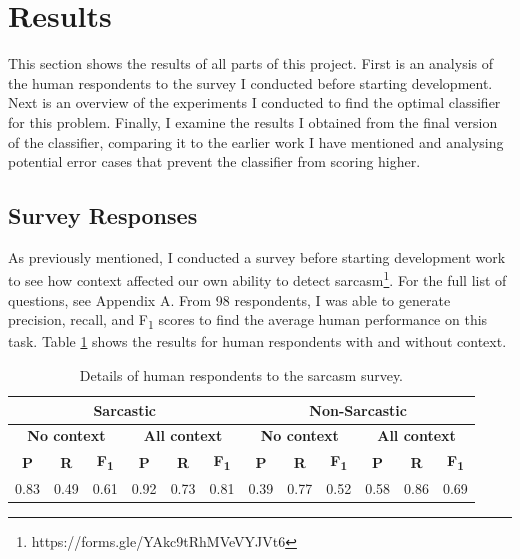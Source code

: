 \documentclass[a4paper,12pt]{article}
\begin{document}
\section{Results}
This section shows the results of all parts of this project. First is an analysis of the human respondents to the survey I conducted before starting development. Next is an overview of the experiments I conducted to find the optimal classifier for this problem. Finally, I examine the results I obtained from the final version of the classifier, comparing it to the earlier work I have mentioned and analysing potential error cases that prevent the classifier from scoring higher.

\subsection{Survey Responses}
As previously mentioned, I conducted a survey before starting development work to see how context affected our own ability to detect sarcasm\footnote{https://forms.gle/YAkc9tRhMVeVYJVt6}. For the full list of questions, see Appendix A. From 98 respondents, I was able to generate precision, recall, and F\textsubscript{1} scores to find the average human performance on this task. Table \ref{tab:cmd2} shows the results for human respondents with and without context.

\begin{table}[h!]
\begin{tabular}{|c|c|c|c|c|c|c|c|c|c|c|c|}
\hline
\multicolumn{6}{|c|}{\textbf{Sarcastic}}                                                                      & \multicolumn{6}{c|}{\textbf{Non-Sarcastic}}                                                                   \\ \hline
\multicolumn{3}{|c|}{\textbf{No context}}             & \multicolumn{3}{c|}{\textbf{All context}}             & \multicolumn{3}{c|}{\textbf{No context}}              & \multicolumn{3}{c|}{\textbf{All context}}             \\ \hline
\textbf{P} & \textbf{R} & \textbf{F\textsubscript{1}} & \textbf{P} & \textbf{R} & \textbf{F\textsubscript{1}} & \textbf{P} & \textbf{R} & \textbf{F\textsubscript{1}} & \textbf{P} & \textbf{R} & \textbf{F\textsubscript{1}} \\ \hline
0.83       & 0.49       & 0.61                        & 0.92       & 0.73       & 0.81                        & 0.39       & 0.77       & 0.52                        & 0.58       & 0.86       & 0.69                        \\ \hline
\end{tabular}
\caption{Details of human respondents to the sarcasm survey.}
\label{tab:cmd2}
\end{table}
\end{document}
